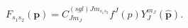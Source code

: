\begin{equation}
F_{s_{1}s_{2}}(\mathbf{p})=C_{Jm_{J}}^{\left( sgl\right)
Jm_{s_{1}s_{2}}}f^{J}(p)Y_{J}^{m_{J}}(\hat{\mathbf{p}}).
\end{equation}

